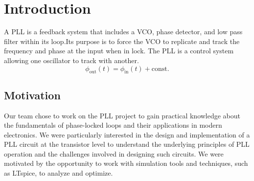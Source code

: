 \chapter{Introduction}
 A PLL is a feedback system that includes a VCO, phase detector, and low pass filter within its loop.Its purpose is to force the VCO to replicate and track the frequency and phase at the input when in lock. The PLL is a control system allowing one oscillator to track with another.
\begin{equation}
    \label{eq:pll_1}
    \phi_{\text{out}}(t) = \phi_{\text{in}}(t) + \text{const.}
\end{equation}

\section{Motivation}
Our team chose to work on the PLL project to gain practical knowledge about the fundamentals of phase-locked loops and their applications in modern electronics. We were particularly interested in the design and implementation of a PLL circuit at the transistor level to understand the underlying principles of PLL operation and the challenges involved in designing such circuits. We were motivated by the opportunity to work with simulation tools and techniques, such as LTspice, to analyze and optimize.

